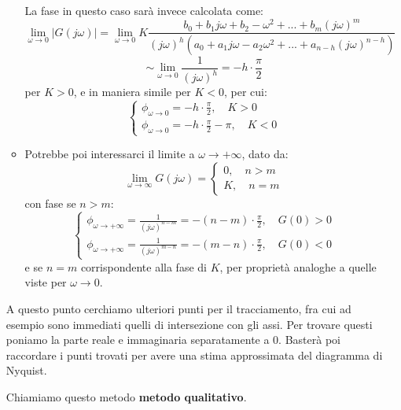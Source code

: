 \documentclass[a4paper,11pt]{article}
\begin{document}
\begin{enumerate}
\begin{itemize}
				La fase in questo caso sarà invece calcolata come:
				$$
				\lim_{\omega \rightarrow 0} |G(j \omega)|
				= \lim_{\omega \rightarrow 0} K \frac{ b_0 + b_1 j \omega + b_2 -\omega^2 + ... + b_m (j \omega)^m }{ (j \omega)^h ( a_0 + a_1 j \omega -a_2 \omega^2 + ... + a_{n - h} (j \omega)^{n - h} ) }
				$$
				$$
				\sim \lim_{\omega \rightarrow 0} \frac{1}{(j\omega)^h} = -h \cdot \frac{\pi}{2} 
				$$
				per $K > 0$, e in maniera simile per $K < 0$, per cui:
				\[
					\begin{cases}
						\phi_{\omega \rightarrow 0} = -h \cdot \frac{\pi}{2} , \quad K > 0 \\
						\phi_{\omega \rightarrow 0} = -h \cdot \frac{\pi}{2} - \pi, \quad K < 0
					\end{cases}
				\]
			\item 
				Potrebbe poi interessarci il limite a $\omega \rightarrow +\infty$, dato da:
				\[
					\lim_{\omega \rightarrow \infty} G(j\omega) = 	
					\begin{cases}
						0, \quad n > m \\
						K, \quad n = m
					\end{cases}
				\]
				con fase se $n > m$:
				\[
					\begin{cases}
						\phi_{\omega \rightarrow +\infty} = \frac{1}{(j\omega)^{n - m}} = - (n - m) \cdot \frac{\pi}{2}, \quad G(0) > 0 \\
						\phi_{\omega \rightarrow +\infty} = \frac{1}{(j\omega)^{m - n}} = - (m - n) \cdot \frac{\pi}{2}, \quad G(0) < 0
					\end{cases}
				\]
				e se $n = m$ corrispondente alla fase di $K$, per proprietà analoghe a quelle viste per $\omega \rightarrow 0$.
		\end{itemize}

		A questo punto cerchiamo ulteriori punti per il tracciamento, fra cui ad esempio sono immediati quelli di intersezione con gli assi.
		Per trovare questi poniamo la parte reale e immaginaria separatamente a 0.
		Basterà poi raccordare i punti trovati per avere una stima approssimata del diagramma di Nyquist.

		Chiamiamo questo metodo \textbf{metodo qualitativo}.
\end{enumerate}
\end{document}
